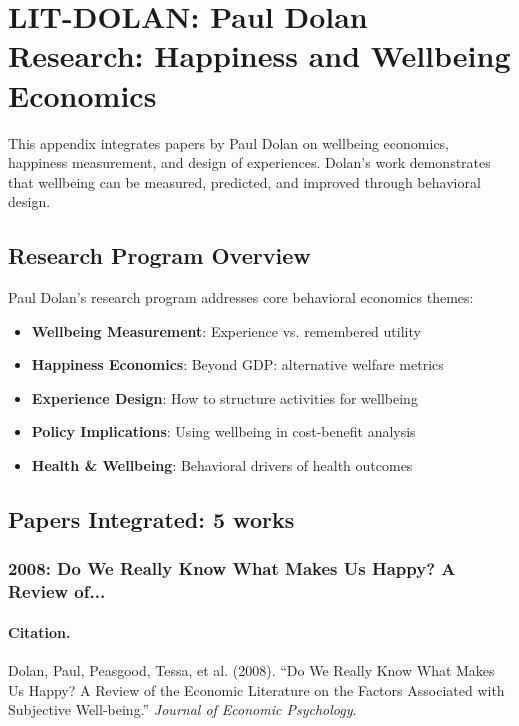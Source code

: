 \section{LIT-DOLAN: Paul Dolan Research: Happiness and Wellbeing Economics}
\label{app:litac}

This appendix integrates papers by Paul Dolan on wellbeing economics,
happiness measurement, and design of experiences. Dolan's work demonstrates that
wellbeing can be measured, predicted, and improved through behavioral design.

\subsection{Research Program Overview}

Paul Dolan's research program addresses core behavioral economics themes:

\begin{itemize}
  \item \textbf{Wellbeing Measurement}: Experience vs. remembered utility
  \item \textbf{Happiness Economics}: Beyond GDP: alternative welfare metrics
  \item \textbf{Experience Design}: How to structure activities for wellbeing
  \item \textbf{Policy Implications}: Using wellbeing in cost-benefit analysis
  \item \textbf{Health & Wellbeing}: Behavioral drivers of health outcomes
\end{itemize}

\subsection{Papers Integrated: 5 works}

\subsubsection{2008: Do We Really Know What Makes Us Happy? A Review of...}

\paragraph{Citation.}
Dolan, Paul, Peasgood, Tessa, et al. (2008). ``Do We Really Know What Makes Us Happy? A Review of the Economic Literature on the Factors Associated with Subjective Well-being.''
\textit{Journal of Economic Psychology}.

